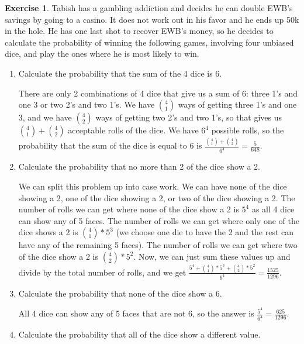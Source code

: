 \documentclass[12pt]{amsart}
\theoremstyle{definition}
\newtheorem{exercise}{Exercise}
\numberwithin{equation}{section}
\theoremstyle{plain}
\begin{document}
 
\begin{exercise}
\newline
Tabish has a gambling addiction and decides he can double EWB's savings by going to a casino. It does not work out in his favor and he ends up 50k in the hole. He has one last shot to recover EWB's money, so he decides to calculate the probability of winning the following games, involving four unbiased dice, and play the ones where he is most likely to win.
\begin{enumerate}[label=\Alph*.]
    \item Calculate the probability that the sum of the 4 dice is 6. 
\begin{answer}There are only 2 combinations of 4 dice that give us a sum of 6: three 1's and one 3 or two 2's and two 1's. We have $\binom{4}{1}$ ways of getting three 1's and one 3, and we have $\binom{4}{2}$ ways of getting two 2's and two 1's, so that gives us $\binom{4}{1}+\binom{4}{2}$ acceptable rolls of the dice. We have $6^4$ possible rolls, so the probability that the sum of the dice is equal to 6 is $\frac{\binom{4}{1}+\binom{4}{2}}{6^4}=\frac{5}{648}$.
\end{answer}
\item Calculate the probability that no more than 2 of the dice show a 2. 
\begin{answer}We can split this problem up into case work. We can have none of the dice showing a 2, one of the dice showing a 2, or two of the dice showing a 2. The number of rolls we can get where none of the dice show a 2 is $5^4$ as all 4 dice can show any of 5 faces. The number of rolls we can get where only one of the dice shows a 2 is $\binom{4}{1}*5^3$ (we choose one die to have the 2 and the rest can have any of the remaining 5 faces). The number of rolls we can get where two of the dice show a 2 is $\binom{4}{2}*5^2$. Now, we can just sum these values up and divide by the total number of rolls, and we get $\frac{5^4 + \binom{4}{1}*5^3 + \binom{4}{2}*5^2}{6^4}=\frac{1525}{1296}$.
\end{answer}
\item Calculate the probability that none of the dice show a 6.
\begin{answer}
All 4 dice can show any of 5 faces that are not 6, so the answer is $\frac{5^4}{6^4}=\frac{625}{1296}$.
\end{answer}
\item Calculate the probability that all of the dice show a different value.

\end{enumerate}
\end{exercise}
\end{document}
